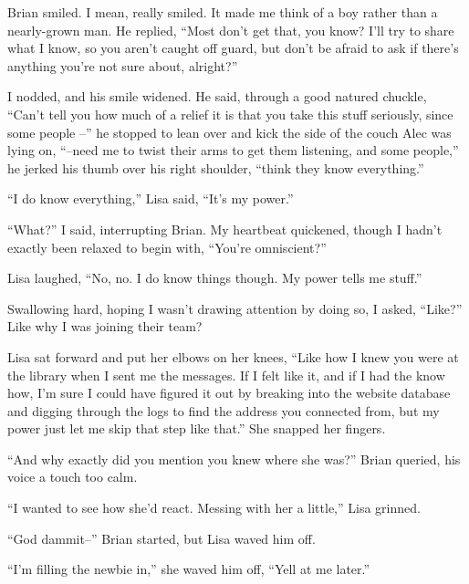 Brian smiled.  I mean, really smiled.  It made me think of a boy rather than a nearly-grown man.  He replied, ``Most don't get that, you know?  I'll try to share what I know, so you aren't caught off guard, but don't be afraid to ask if there's anything you're not sure about, alright?''



I nodded, and his smile widened.  He said, through a good natured chuckle, ``Can't tell you how much of a relief it is that you take this stuff seriously, since some people --'' he stopped to lean over and kick the side of the couch Alec was lying on, ``--need me to twist their arms to get them listening, and some people,'' he jerked his thumb over his right shoulder, ``think they know everything.''



``I do know everything,'' Lisa said, ``It's my power.''



``What?'' I said, interrupting Brian.  My heartbeat quickened, though I hadn't exactly been relaxed to begin with, ``You're omniscient?''



Lisa laughed, ``No, no.  I do know things though.  My power tells me stuff.''



Swallowing hard, hoping I wasn't drawing attention by doing so, I asked, ``Like?''  Like why I was joining their team?



Lisa sat forward and put her elbows on her knees, ``Like how I knew you were at the library when I sent me the messages.  If I felt like it, and if I had the know how, I'm sure I could have figured it out by breaking into the website database and digging through the logs to find the address you connected from, but my power just let me skip that step like that.'' She snapped her fingers.



``And why exactly did you mention you knew where she was?'' Brian queried, his voice a touch too calm.



``I wanted to see how she'd react.  Messing with her a little,'' Lisa grinned.



``God dammit--'' Brian started, but Lisa waved him off.



``I'm filling the newbie in,'' she waved him off, ``Yell at me later.''




